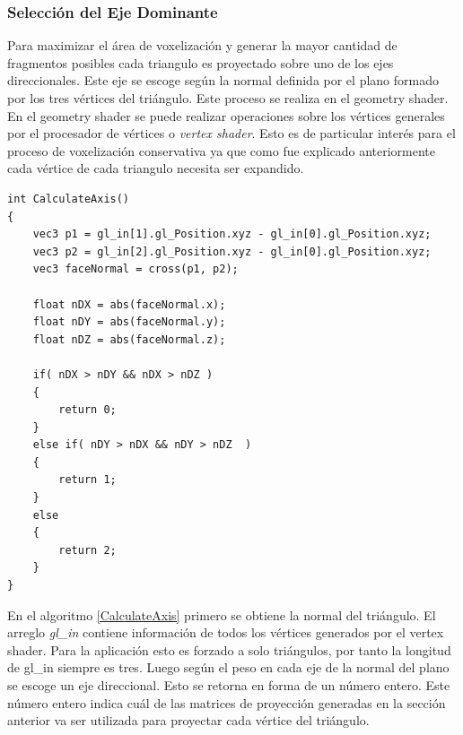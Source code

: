 \subsubsection{Selección del Eje Dominante}
Para maximizar el área de voxelización y generar la mayor cantidad de fragmentos posibles cada triangulo es proyectado sobre uno de los ejes direccionales. Este eje se escoge según la normal definida por el plano formado por los tres vértices del triángulo. Este proceso se realiza en el geometry shader. En el geometry shader se puede realizar operaciones sobre los vértices generales por el procesador de vértices o \emph{vertex shader}. Esto es de particular interés para el proceso de voxelización conservativa ya que como fue explicado anteriormente cada vértice de cada triangulo necesita ser expandido.
\\
\begin{lstlisting}[caption={Selección del eje dominante para la proyección ortogonal.}, label=CalculateAxis]
int CalculateAxis()
{
	vec3 p1 = gl_in[1].gl_Position.xyz - gl_in[0].gl_Position.xyz;
	vec3 p2 = gl_in[2].gl_Position.xyz - gl_in[0].gl_Position.xyz;
	vec3 faceNormal = cross(p1, p2);

	float nDX = abs(faceNormal.x);
	float nDY = abs(faceNormal.y);
	float nDZ = abs(faceNormal.z);

	if( nDX > nDY && nDX > nDZ )
    {
		return 0;
	}
	else if( nDY > nDX && nDY > nDZ  )
    {
	    return 1;
    }
	else
    {
	    return 2;
	}
}
\end{lstlisting}

En el algoritmo \ref{CalculateAxis} primero se obtiene la normal del triángulo. El arreglo \emph{gl\_in} contiene información de todos los vértices generados por el vertex shader. Para la aplicación esto es forzado a solo triángulos, por tanto la longitud de gl\_in siempre es tres. Luego según el peso en cada eje de la normal del plano se escoge un eje direccional. Esto se retorna en forma de un número entero. Este número entero indica cuál de las matrices de proyección generadas en la sección anterior va ser utilizada para proyectar cada vértice del triángulo.


